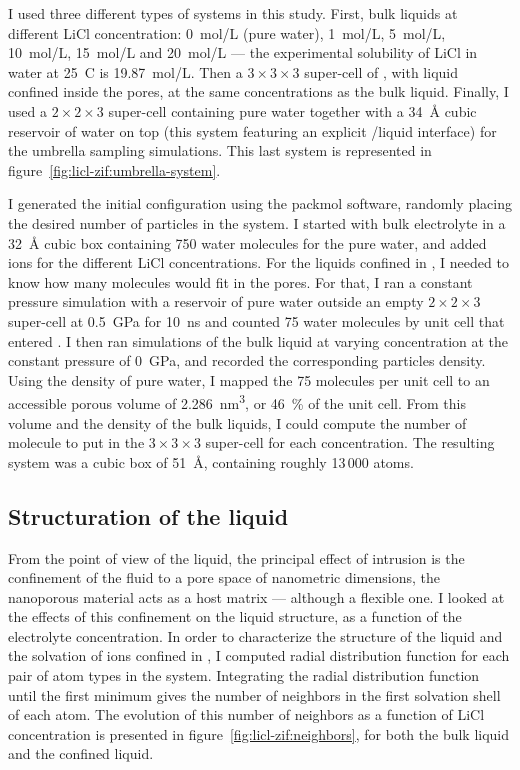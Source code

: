 \documentclass[thesis]{subfiles}
\begin{document}
I used three different types of systems in this study. First, bulk liquids at
different LiCl concentration: \SI{0}{mol/L} (pure water), \SI{1}{mol/L},
\SI{5}{mol/L}, \SI{10}{mol/L}, \SI{15}{mol/L} and \SI{20}{mol/L} --- the
experimental solubility of LiCl in water at 25~{\textdegree C} is
\SI{19.87}{mol/L}. Then a $3\times3\times3$ super-cell of , with liquid
confined inside the pores, at the same concentrations as the bulk liquid.
Finally, I used a $2\times2\times3$  super-cell containing pure water
together with a \SI{34}{\AA} cubic reservoir of water on top (this system
featuring an explicit /liquid interface) for the umbrella sampling
simulations. This last system is represented in
figure~\ref{fig:licl-zif:umbrella-system}.

I generated the initial configuration using the packmol
software\cite{Martnez2009}, randomly placing the desired number of particles in
the system. I started with bulk electrolyte in a \SI{32}{\AA} cubic box
containing 750 water molecules for the pure water, and added ions for the
different LiCl concentrations. For the liquids confined in , I needed to
know how many molecules would fit in the  pores. For that, I ran a constant
pressure simulation with a reservoir of pure water outside an empty
$2\times2\times3$  super-cell at \SI{0.5}{GPa} for \SI{10}{ns} and counted
75 water molecules by unit cell that entered . I then ran simulations of
the bulk liquid at varying concentration at the constant pressure of
\SI{0}{GPa}, and recorded the corresponding particles density. Using the density
of pure water, I mapped the 75 molecules per unit cell to an accessible porous
volume of \SI{2.286}{nm^3}, or 46~\% of the unit cell. From this volume and the
density of the bulk liquids, I could compute the number of molecule to put
in the $3\times3\times3$ super-cell for each concentration. The resulting
system was a cubic box of \SI{51}{\AA}, containing roughly 13\,000 atoms.

\subsection{Structuration of the liquid}
\label{sec:licl-zifliquid-structure}

From the point of view of the liquid, the principal effect of intrusion is the
confinement of the fluid to a pore space of nanometric dimensions, \ie the
nanoporous material acts as a host matrix --- although a flexible one. I looked
at the effects of this confinement on the liquid structure, as a function of the
electrolyte concentration. In order to characterize the structure of the liquid
and the solvation of ions confined in , I computed radial distribution
function for each pair of atom types in the system. Integrating the radial
distribution function until the first minimum gives the number of neighbors in
the first solvation shell of each atom. The evolution of this number of
neighbors as a function of LiCl concentration is presented in
figure~\ref{fig:licl-zif:neighbors}, for both the bulk liquid and the confined
liquid.
\end{document}
